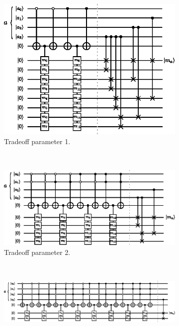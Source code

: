 \documentclass[a4paper,12pt]{article}
\begin{document}
\begin{figure}
\centering
\begin{subfigure}{0.6\textwidth}
 \centering
 \includegraphics[scale=1.3]{images/select-swap-lambda-1}
 \caption{Tradeoff parameter 1.}
 \end{subfigure} \\ \vspace{0.5cm}
\begin{subfigure}[ht!]{0.8\textwidth}
 \centering
 \includegraphics[scale=1.3]{images/select-swap-lambda-2}
 \caption{Tradeoff parameter 2.}
 \end{subfigure} \\ \vspace{0.5cm}
\begin{subfigure}[ht!]{\textwidth}
 \centering
 \includegraphics[scale=1.3]{images/select-swap-lambda-3}

\end{subfigure}
\end{figure}
\end{document}
